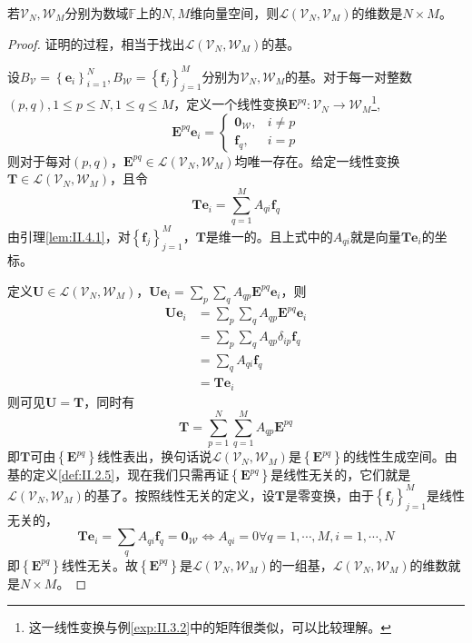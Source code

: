\documentclass[main.tex]{subfiles}
\begin{document}
\begin{theorem}\label{thm:II.4.2}
若$\mathcal{V}_N,\mathcal{W}_M$分别为数域$\mathbb{F}$上的$N,M$维向量空间，则$\mathcal{L}\left(\mathcal{V}_N,\mathcal{V}_M\right)$的维数是$N\times M$。
\end{theorem}
\begin{proof}
证明的过程，相当于找出$\mathcal{L}\left(\mathcal{V}_N,\mathcal{W}_M\right)$的基。

设$B_\mathcal{V}=\left\{\mathbf{e}_i\right\}_{i=1}^N,B_\mathcal{W}=\left\{\mathbf{f}_j\right\}_{j=1}^M$分别为$\mathcal{V}_N,\mathcal{W}_M$的基。对于每一对整数$\left(p,q\right),1\leq p\leq N,1\leq q\leq M$，定义一个线性变换$\mathbf{E}^{pq}:\mathcal{V}_N\rightarrow\mathcal{W}_M$\footnote{这一线性变换与例\ref{exp:II.3.2}中的矩阵很类似，可以比较理解。},
\[
\mathbf{E}^{pq}\mathbf{e}_i=\left\{\begin{array}{cc}
    \mathbf{0}_\mathcal{W},&i\neq p  \\
     \mathbf{f}_q,&i=p 
\end{array}\right.
\]
则对于每对$\left(p,q\right)$，$\mathbf{E}^{pq}\in\mathcal{L}\left(\mathcal{V}_N,\mathcal{W}_M\right)$均唯一存在。给定一线性变换$\mathbf{T}\in\mathcal{L}\left(\mathcal{V}_N,\mathcal{W}_M\right)$，且令
\[\mathbf{Te}_i=\sum_{q=1}^MA_{qi}\mathbf{f}_q\]
由引理\ref{lem:II.4.1}，对$\left\{\mathbf{f}_j\right\}_{j=1}^M$，$\mathbf{T}$是维一的。且上式中的$A_{qi}$就是向量$\mathbf{Te}_i$的坐标。

定义$\mathbf{U}\in\mathcal{L}\left(\mathcal{V}_N,\mathcal{W}_M\right)$，$\mathbf{Ue}_i=\sum_p\sum_qA_{qp}\mathbf{E}^{pq}\mathbf{e}_i$，则
\begin{align*}
    \mathbf{Ue}_i&=\sum_p\sum_qA_{qp}\mathbf{E}^{pq}\mathbf{e}_i\\
    &=\sum_p\sum_qA_{qp}\delta_{ip}\mathbf{f}_q\\
    &=\sum_qA_{qi}\mathbf{f}_q\\
    &=\mathbf{Te}_i
\end{align*}
则可见$\mathbf{U}=\mathbf{T}$，同时有
\[\mathbf{T}=\sum_{p=1}^N\sum_{q=1}^MA_{qp}\mathbf{E}^{pq}\]
即$\mathbf{T}$可由$\left\{\mathbf{E}^{pq}\right\}$线性表出，换句话说$\mathcal{L}\left(\mathcal{V}_N,\mathcal{W}_M\right)$是$\left\{\mathbf{E}^{pq}\right\}$的线性生成空间。由基的定义\ref{def:II.2.5}，现在我们只需再证$\left\{\mathbf{E}^{pq}\right\}$是线性无关的，它们就是$\mathcal{L}\left(\mathcal{V}_N,\mathcal{W}_M\right)$的基了。按照线性无关的定义，设$\mathbf{T}$是零变换，由于$\left\{\mathbf{f}_j\right\}_{j=1}^M$是线性无关的，
\[\mathbf{Te}_i=\sum_q A_{qi}\mathbf{f}_q=\mathbf{0}_\mathcal{W}\Leftrightarrow A_{qi}=0\forall q=1,\cdots,M,i=1,\cdots,N\]
即$\left\{\mathbf{E}^{pq}\right\}$线性无关。故$\left\{\mathbf{E}^{pq}\right\}$是$\mathcal{L}\left(\mathcal{V}_N,\mathcal{W}_M\right)$的一组基，$\mathcal{L}\left(\mathcal{V}_N,\mathcal{W}_M\right)$的维数就是$N\times M$。
\end{proof}
\end{document}
